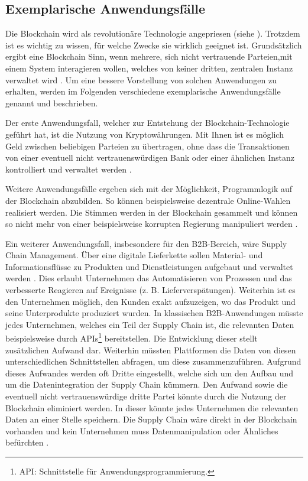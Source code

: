 \subsection{Exemplarische Anwendungsfälle}
\label{subsec:use-cases}
Die Blockchain wird als revolutionäre Technologie angepriesen (siehe \cite{TapscottBlockchainRevolutionWieTechnologie2016}). Trotzdem ist es wichtig zu wissen, für welche Zwecke sie wirklich geeignet ist. Grundsätzlich ergibt eine Blockchain Sinn, wenn mehrere, sich nicht vertrauende Parteien,mit einem System interagieren wollen, welches von keiner dritten, zentralen Instanz verwaltet wird \cite{WustyouneedBlockchain2017}. Um eine bessere Vorstellung von solchen Anwendungen zu erhalten, werden im Folgenden verschiedene exemplarische Anwendungsfälle genannt und beschrieben.

Der erste Anwendungsfall, welcher zur Entstehung der Blockchain-Technologie geführt hat, ist die Nutzung von Kryptowährungen. Mit Ihnen ist es möglich Geld zwischen beliebigen Parteien zu übertragen, ohne dass die Transaktionen von einer eventuell nicht vertrauenswürdigen Bank oder einer ähnlichen Instanz kontrolliert und verwaltet werden \cite[S.~\Rn{10}]{SwanBlockchainblueprintnew2015}.

Weitere Anwendungsfälle ergeben sich mit der Möglichkeit, Programmlogik auf der Blockchain abzubilden. So können beispielsweise dezentrale Online-Wahlen realisiert werden. Die Stimmen werden in der Blockchain gesammelt und können so nicht mehr von einer beispielsweise korrupten Regierung manipuliert werden \cite{CastorEthereumVotingScheme2017}.

Ein weiterer Anwendungsfall, insbesondere für den \acs{B2B}-Bereich, wäre Supply Chain Management. Über eine digitale Lieferkette sollen Material- und Informationsflüsse zu Produkten und Dienstleistungen aufgebaut und verwaltet werden \cite{KriegerSupplyChainManagement}. Dies erlaubt Unternehmen das Automatisieren von Prozessen und das verbesserte Reagieren auf Ereignisse (z. B. Lieferverspätungen). Weiterhin ist es den Unternehmen möglich, den Kunden exakt aufzuzeigen, wo das Produkt und seine Unterprodukte produziert wurden. In klassischen \acs{B2B}-Anwendungen müsste jedes Unternehmen, welches ein Teil der Supply Chain ist, die relevanten Daten beispielsweise durch APIs\footnote{API: Schnittstelle für Anwendungsprogrammierung\cite{DigHowAPIsevolve2006}.} bereitstellen. Die Entwicklung dieser stellt zusätzlichen Aufwand dar. Weiterhin müssten Plattformen die Daten von diesen unterschiedlichen Schnittstellen abfragen, um diese zusammenzuführen. Aufgrund dieses Aufwandes werden oft Dritte eingestellt, welche sich um den Aufbau und um die Datenintegration der Supply Chain kümmern. Den Aufwand sowie die eventuell nicht vertrauenswürdige dritte Partei könnte durch die Nutzung der Blockchain eliminiert werden. In dieser könnte jedes Unternehmen die relevanten Daten an einer Stelle speichern. Die Supply Chain wäre direkt in der Blockchain vorhanden und kein Unternehmen muss Datenmanipulation oder Ähnliches befürchten \cite{KorpelaDigitalSupplyChain2017}.

